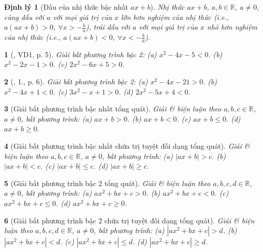 \documentclass{article}
\newtheorem{baitoan}{}
\newtheorem{dinhly}{Định lý}
\begin{document}
\begin{dinhly}[Dấu của nhị thức bậc nhất $ax + b$]
	Nhị thức $ax + b$, $a,b\in\mathbb{R}$, $a\ne0$, cùng dấu với $a$ với mọi giá trị của $x$ lớn hơn nghiệm của nhị thức (i.e., $a(ax + b) > 0$, $\forall x > -\frac{b}{a}$), trái dấu với $a$ với mọi giá trị của $x$ nhỏ hơn nghiệm của nhị thức (i.e., $a(ax + b) < 0$, $\forall x < -\frac{b}{a}$).
\end{dinhly}

\begin{baitoan}[\cite{Binh_Toan_9_tap_1}, VD1, p. 5]
	Giải bất phương trình bậc 2: (a) $x^2 - 4x - 5 < 0$. (b) $x^2 - 2x - 1 > 0$. (c) $2x^2 - 6x + 5 > 0$.
\end{baitoan}

\begin{baitoan}[\cite{Binh_Toan_9_tap_1}, 1., p. 6]
	Giải bất phương trình bậc 2: (a) $x^2 - 4x - 21 > 0$. (b) $x^2 - 4x + 1 < 0$. (c) $3x^2 - x + 1 > 0$. (d) $2x^2 - 5x + 4 < 0$.
\end{baitoan}

\begin{baitoan}[Giải bất phương trình bậc nhất tổng quát]
	Giải \& biện luận theo $a,b,c\in\mathbb{R}$, $a\ne0$, bất phương trình: (a) $ax + b > 0$. (b) $ax + b < 0$. (c) $ax + b\le0$. (d) $ax + b\ge0$.
\end{baitoan}

\begin{baitoan}[Giải bất phương trình bậc nhất chứa trị tuyệt đối dạng tổng quát]
	Giải \& biện luận theo $a,b,c\in\mathbb{R}$, $a\ne0$, bất phương trình: (a) $|ax + b| > c$. (b) $|ax + b| < c$. (c) $|ax + b|\le c$. (d) $|ax + b|\ge c$.
\end{baitoan}

\begin{baitoan}[Giải bất phương trình bậc 2 tổng quát]
	Giải \& biện luận theo $a,b,c,d\in\mathbb{R}$, $a\ne0$, bất phương trình: (a) $ax^2 + bx + c > 0$. (b) $ax^2 + bx + c < 0$. (c) $ax^2 + bx + c\le0$. (d) $ax^2 + bx + c\ge0$.
\end{baitoan}

\begin{baitoan}[Giải bất phương trình bậc 2 chứa trị tuyệt đối dạng tổng quát]
	Giải \& biện luận theo $a,b,c,d\in\mathbb{R}$, $a\ne0$, bất phương trình: (a) $|ax^2 + bx + c| > d$. (b) $|ax^2 + bx + c| < d$. (c) $|ax^2 + bx + c|\le d$. (d) $|ax^2 + bx + c|\ge d$.
\end{baitoan}
\end{document}
